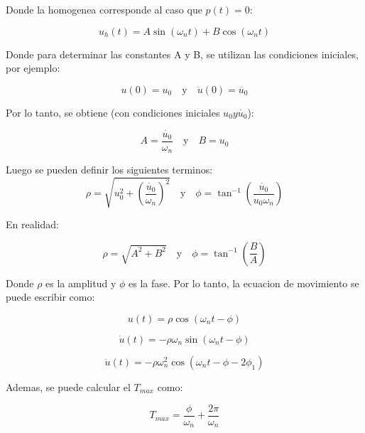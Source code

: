 \documentclass{article}  %
\begin{document}
Donde la homogenea corresponde al caso que $p(t) = 0$:

\begin{equation}
    u_h(t) = A \sin(\omega_n t) + B \cos(\omega_n t)
\end{equation}

Donde para determinar las constantes A y B, se utilizan las condiciones iniciales, por ejemplo:

\begin{equation}
    u(0) = u_0 \quad \text{y} \quad \ddot{u}(0) = \ddot{u_0}
\end{equation}

Por lo tanto, se obtiene (con condiciones iniciales $u_0 y \dot{u_0}$):

\begin{equation}
    A = \frac{\dot{u_0}}{\omega_n} \quad \text{y} \quad B = u_0
\end{equation}

Luego se pueden definir los siguientes terminos:
\begin{equation}
    \rho = \sqrt{u_0^2 + (\frac{\dot{u_0}}{\omega_n})^2} \quad \text{y} \quad \phi = \tan^{-1}(\frac{\dot{u_0}}{u_0 \omega_n})
\end{equation}

En realidad:

\begin{equation}
    \rho = \sqrt{A^2 + B^2} \quad \text{y} \quad \phi = \tan^{-1}(\frac{B}{A})
\end{equation}

Donde $\rho$ es la amplitud y $\phi$ es la fase. Por lo tanto, la ecuacion de movimiento se puede escribir como:

\begin{equation}
    u(t) = \rho \cos(\omega_n t - \phi)
\end{equation}

\begin{equation}
    \dot{u}(t) = -\rho \omega_n \sin(\omega_n t - \phi)
\end{equation}

\begin{equation}
    \ddot{u}(t) = -\rho \omega_n^2 \cos(\omega_n t - \phi - 2\phi_1)
\end{equation}

Ademas, se puede calcular el $T_{max}$ como:

\begin{equation}
    T_{max} = \frac{\phi}{\omega_n} + \frac{2\pi}{\omega_n} 
\end{equation}
\end{document}
